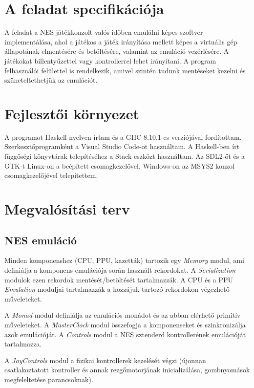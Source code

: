 \section{A feladat specifikációja}

A feladat a NES játékkonzolt valós időben emulálni képes szoftver implementálása, ahol a játékos a játék irányítása mellett képes a virtuális gép állapotának elmentésére és betöltésére, valamint az emuláció vezérlésére. A játékokat billentyűzettel vagy kontrollerrel lehet irányítani. A program felhasználói felülettel is rendelkezik, amivel szintén tudunk mentéseket kezelni és szüneteltethetjük az emulációt.

\section{Fejlesztői környezet}

A programot Haskell nyelven írtam és a GHC 8.10.1-es verziójával fordítottam. Szerkesztőprogramként a Visual Studio Code-ot használtam. A Haskell-ben írt függőségi könyvtárak telepítéséhez a Stack eszközt használtam.
Az SDL2-őt és a GTK-t Linux-on a beépített csomagkezelővel, Windows-on az MSYS2 konzol csomagkezelőjével telepítettem.

\section{Megvalósítási terv}

\subsection{NES emuláció}

Minden komponenshez (CPU, PPU, kazetták) tartozik egy \emph{Memory} modul, ami definiálja a komponens emulációja során használt rekordokat. A \emph{Serialization} modulok ezen rekordok mentését/betöltését tartalmazzák. A CPU és a PPU \emph{Emulation} moduljai tartalmazzák a hozzájuk tartozó rekordokon végezhető műveleteket.

A \emph{Monad} modul definiálja az emulációs monádot és az abban elérhető primitív műveleteket.
A \emph{MasterClock} modul összefogja a komponenseket és szinkronizálja azok emulációját.
A \emph{Controls} modul a NES sztenderd kontrollerének emulációját tartalmazza.   

A \emph{JoyControls} modul a fizikai kontrollerek kezelését végzi (újonnan csatlakoztatott kontroller és annak rezgőmotorjának inicializálása, gombnyomások megfeleltetése parancsoknak).

